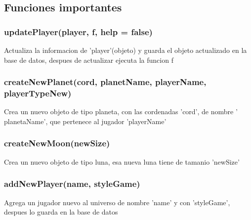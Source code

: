 \documentclass{article}
\begin{document}
    \subsection{Funciones importantes}
        \subsubsection{updatePlayer(player, f, help = false)}
            Actualiza la informacion de 'player'(objeto) y guarda el objeto actualizado en la base de datos, despues de actualizar ejecuta la funcion f
        \subsubsection{createNewPlanet(cord, planetName, playerName, playerTypeNew)}
            Crea un nuevo objeto de tipo planeta, con las cordenadas 'cord', de nombre ' planetaName', que pertenece al jugador 'playerName'
        \subsubsection{createNewMoon(newSize)}
            Crea un nuevo objeto de tipo luna, esa nueva luna tiene de tamanio 'newSize'
        \subsubsection{addNewPlayer(name, styleGame)}
            Agrega un jugador nuevo al universo de nombre 'name' y con 'styleGame', despues lo guarda en la base de datos
\end{document}
